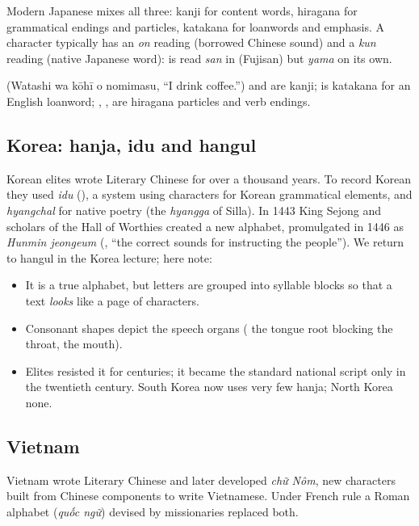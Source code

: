 Modern Japanese mixes all three: kanji for content words, hiragana for grammatical
endings and particles, katakana for loanwords and emphasis. A character typically has an
\emph{on} reading (borrowed Chinese sound) and a \emph{kun} reading (native Japanese
word):  is read \emph{san} in  (Fujisan) but \emph{yama} on its own.

\begin{example}
 (Watashi wa kōhī o nomimasu, ``I drink coffee.'')
 and  are kanji;  is katakana for an English loanword;
, ,  are hiragana particles and verb endings.
\end{example}

\subsection{Korea: hanja, idu and hangul}

Korean elites wrote Literary Chinese for over a thousand years. To record Korean they
used \emph{idu} (), a system using characters for Korean grammatical elements, and
\emph{hyangchal} for native poetry (the \emph{hyangga} of Silla). In 1443 King Sejong and
scholars of the Hall of Worthies created a new alphabet, promulgated in 1446 as
\emph{Hunmin jeongeum} (, ``the correct sounds for instructing the
people''). We return to hangul in the Korea lecture; here note:

\begin{itemize}
  \item It is a true alphabet, but letters are grouped into syllable blocks so that a
        text \emph{looks} like a page of characters.
  \item Consonant shapes depict the speech organs ( the tongue root blocking the
        throat,  the mouth).
  \item Elites resisted it for centuries; it became the standard national script only in
        the twentieth century. South Korea now uses very few hanja; North Korea none.
\end{itemize}

\subsection{Vietnam}

Vietnam wrote Literary Chinese and later developed \emph{chữ Nôm}, new characters built
from Chinese components to write Vietnamese. Under French rule a Roman alphabet
(\emph{quốc ngữ}) devised by missionaries replaced both.

